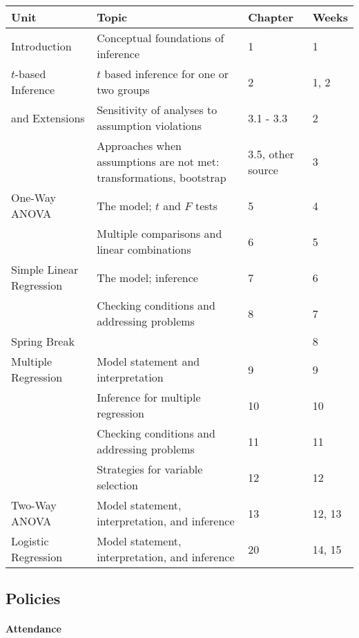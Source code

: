 \documentclass[11pt]{article}
\begin{document}
	\begin{table}[!h]
		\begin{tabular}{p{4.3cm} p{7cm} l l}
			\toprule
			Unit & Topic & Chapter & Weeks \\
			\midrule
			Introduction & Conceptual foundations of inference & 1 & 1 \\
			\midrule
			$t$-based Inference & $t$ based inference for one or two groups & 2 & 1, 2 \\
			\cmidrule(r){2-4}
			and Extensions & Sensitivity of analyses to assumption violations & 3.1 - 3.3 & 2 \\
			\cmidrule(r){2-4}
			& Approaches when assumptions are not met: transformations, bootstrap & 3.5, other source & 3 \\
			\midrule
			One-Way ANOVA & The model; $t$ and $F$ tests & 5 & 4 \\
			\cmidrule(r){2-4}
			& Multiple comparisons and linear combinations & 6 & 5 \\
			\midrule
			Simple Linear Regression & The model; inference & 7 & 6 \\
			\cmidrule(r){2-4}
			& Checking conditions and addressing problems & 8 & 7 \\
			\midrule
			Spring Break & & & 8 \\
			\midrule
			Multiple Regression & Model statement and interpretation & 9 & 9 \\
			\cmidrule(r){2-4}
			& Inference for multiple regression & 10 & 10 \\
			\cmidrule(r){2-4}
			& Checking conditions and addressing problems & 11 & 11 \\
			\cmidrule(r){2-4}
			& Strategies for variable selection & 12 & 12 \\
			\midrule
			Two-Way ANOVA & Model statement, interpretation, and inference & 13 & 12, 13 \\
			\midrule
			Logistic Regression & Model statement, interpretation, and inference & 20 & 14, 15 \\
			\bottomrule
		\end{tabular}
	\end{table}
	
	\newpage
	
	\subsection*{Policies}
	
	\paragraph{Attendance}
	
\end{document}
